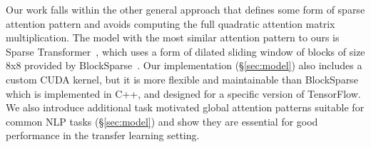 Our work falls within the other general approach that defines some form of sparse attention pattern and avoids computing 
the full quadratic attention matrix multiplication.
The model with the most similar attention pattern to ours is Sparse Transformer~\cite{sparseOpenai}, which uses a form of dilated sliding window of blocks of size 8x8 provided by BlockSparse~\cite{blocksparse}. 
Our implementation (\S\ref{sec:model}) also includes a custom CUDA kernel, but it is more flexible and maintainable than BlockSparse which is implemented in C++, and designed for a specific version of TensorFlow.
We also introduce additional task motivated global attention patterns suitable for common NLP tasks
(\S\ref{sec:model}) and show they are essential for good performance in the transfer learning setting.


